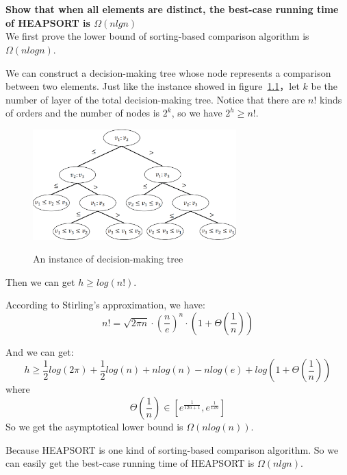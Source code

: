 
\chapter{}
\textbf{
Show that when all elements are distinct, the best-case running time of HEAPSORT is $\Omega(nlg n)$
}
\hspace*{\fill} \\

We first prove the lower bound of sorting-based comparison algorithm is $\Omega(nlog n)$.

We can construct a decision-making tree whose node represents a comparison between two elements. Just like the instance showed in figure~\ref{decision_tree}，let $k$ be the number of layer of the total decision-making tree. Notice that there are $n!$ kinds of orders and the number of nodes is $2^k$, so we have $2^h\geq n!$.
\begin{figure}[!htbp]
  \centering
  \includegraphics[width=0.7\textwidth]{figures/2_1.eps}\\
  \caption{An instance of decision-making tree}\label{decision_tree}
\end{figure}

Then we can get $h\geq log(n!)$.

According to Stirling's approximation, we have:
$$n!=\sqrt{2\pi n}\cdot (\frac{n}{e})^n\cdot (1+\Theta(\frac{1}{n}))$$

And we can get:
$$h\geq \frac{1}{2}log(2\pi)+\frac{1}{2}log(n)+nlog(n)-nlog(e)+log(1+\Theta(\frac{1}{n}))$$
where
$$\Theta(\frac{1}{n})\in[e^{\frac{1}{12n+1}},e^{\frac{1}{12n}}]$$
So we get the asymptotical lower bound is $\Omega(nlog(n))$.

Because HEAPSORT is one kind of sorting-based comparison algorithm. So we can easily get the best-case running time of HEAPSORT is $\Omega(nlg n)$.
